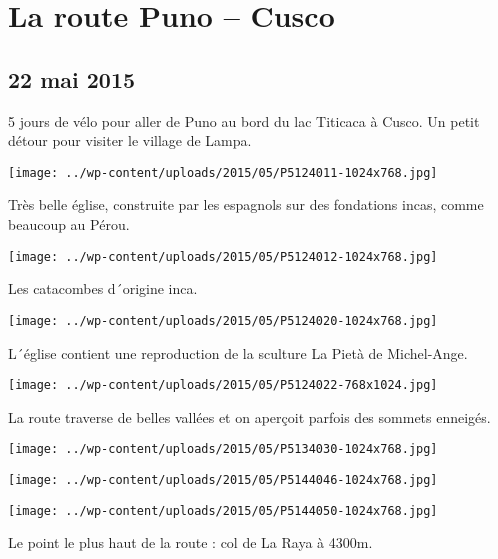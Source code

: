 \chapter{La route Puno – Cusco}
\section*{22 mai 2015}
5 jours de vélo pour aller de Puno au bord du lac Titicaca à Cusco. \newline
 Un petit détour pour visiter le village de Lampa. \newline
 \newline
\centerline{\texttt{[image: ../wp-content/uploads/2015/05/P5124011-1024x768.jpg]} } 
 \newline
 Très belle église, construite par les espagnols sur des fondations incas, comme beaucoup au Pérou. \newline
 \newline
\centerline{\texttt{[image: ../wp-content/uploads/2015/05/P5124012-1024x768.jpg]} } 
 \newline
 Les catacombes d´origine inca. \newline
 \newline
\centerline{\texttt{[image: ../wp-content/uploads/2015/05/P5124020-1024x768.jpg]} } 
 \newline
 L´église contient une reproduction de la sculture La Pietà de Michel-Ange. \newline
 \newline
\centerline{\texttt{[image: ../wp-content/uploads/2015/05/P5124022-768x1024.jpg]} } 
 \newline
 La route traverse de belles vallées et on aperçoit parfois des sommets enneigés. \newline
 \newline
\centerline{\texttt{[image: ../wp-content/uploads/2015/05/P5134030-1024x768.jpg]} } 
 \newline
 \newline
\centerline{\texttt{[image: ../wp-content/uploads/2015/05/P5144046-1024x768.jpg]} } 
 \newline
 \newline
\centerline{\texttt{[image: ../wp-content/uploads/2015/05/P5144050-1024x768.jpg]} } 
 \newline
 Le point le plus haut de la route : col de La Raya à 4300m. \newline
 \newline
